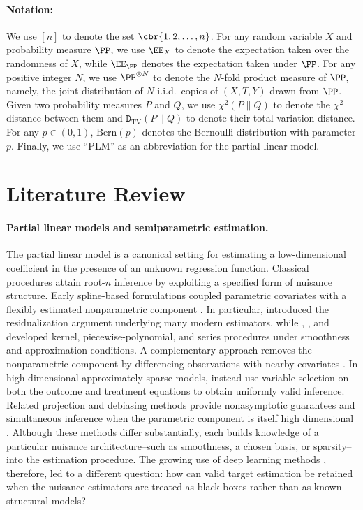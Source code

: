 \documentclass[11pt]{article}
\begin{document}
\paragraph{Notation:}
We use \([n]\) to denote the set \(\cbr{1,2,\ldots,n}\). For any random variable \(X\) and probability measure \(\PP\), we use \(\EE_X\) to denote the expectation taken over the randomness of \(X\), while \(\EE_{\PP}\) denotes the expectation taken under \(\PP\). For any positive integer \(N\), we use \(\PP^{\otimes N}\) to denote the
\(N\)-fold product measure of \(\PP\), namely, the joint distribution of
\(N\) i.i.d.\ copies of \((X,T,Y)\) drawn from \(\PP\). Given two probability measures \(P\) and \(Q\), we use \(\chi^2(P\|Q)\) to denote the \(\chi^2\) distance between them and \(\texttt{D}_{\text{TV}}(P\|Q)\) to denote their total variation distance. For any \(p\in(0,1)\), \(\text{Bern}(p)\) denotes the Bernoulli distribution with parameter \(p\). Finally, we use ``PLM'' as an abbreviation for the partial linear model.

\section{Literature Review}
\label{sec:related-work}

\paragraph{Partial linear models and semiparametric estimation.}
The partial linear model is a canonical setting for estimating a
low-dimensional coefficient in the presence of an unknown regression
function. Classical procedures attain root-$n$ inference by exploiting a
specified form of nuisance structure. Early spline-based formulations coupled
parametric covariates with a flexibly estimated nonparametric component
\citep{engle1986semiparametric,heckman1986spline}. In particular,
\citet{robinson1988root} introduced the residualization argument underlying
many modern estimators, while \citet{speckman1988kernel},
\citet{chen1988convergence}, and \citet{donald1994series} developed kernel,
piecewise-polynomial, and series procedures under smoothness and approximation
conditions. A complementary approach removes the nonparametric component by
differencing observations with nearby covariates \citep{yatchew1997elementary}.
In high-dimensional approximately sparse models, \citet{belloni2014inference}
instead use variable selection on both the outcome and treatment equations to
obtain uniformly valid inference. Related projection and debiasing methods
provide nonasymptotic guarantees and simultaneous inference when the
parametric component is itself high dimensional
\citep{zhu2017nonasymptotic,zhu2019highdimensional}. Although these methods
differ substantially, each builds knowledge of a particular nuisance
architecture--such as smoothness, a chosen basis, or sparsity--into the
estimation procedure. The growing use of deep learning methods
, therefore, led to a different question: how can valid target estimation be
retained when the nuisance estimators are treated as black boxes rather than
as known structural models?
\end{document}
